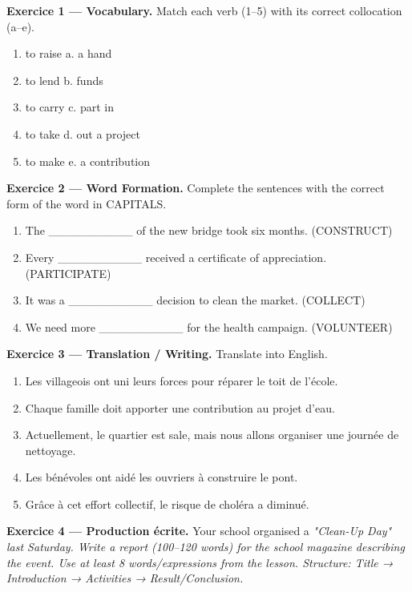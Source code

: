 \documentclass[11pt]{article}
\newcommand{\eng}[1]{\ifmmode\text{\textit{#1}}\else\begingroup\selectlanguage{english}\itshape #1\endgroup\fi}
\begin{document}
\begin{exercice}
\textbf{Exercice 1 — Vocabulary.} Match each verb (1–5) with its correct collocation (a–e).
\begin{enumerate}
\item to raise \quad a. a hand
\item to lend \quad b. funds
\item to carry \quad c. part in
\item to take \quad d. out a project
\item to make \quad e. a contribution
\end{enumerate}

\textbf{Exercice 2 — Word Formation.} Complete the sentences with the correct form of the word in CAPITALS.
\begin{enumerate}
\item The \_\_\_\_\_\_\_\_\_\_ of the new bridge took six months. (CONSTRUCT)
\item Every \_\_\_\_\_\_\_\_\_\_ received a certificate of appreciation. (PARTICIPATE)
\item It was a \_\_\_\_\_\_\_\_\_\_ decision to clean the market. (COLLECT)
\item We need more \_\_\_\_\_\_\_\_\_\_ for the health campaign. (VOLUNTEER)
\end{enumerate}

\textbf{Exercice 3 — Translation / Writing.} Translate into English.
\begin{enumerate}
\item Les villageois ont uni leurs forces pour réparer le toit de l'école.
\item Chaque famille doit apporter une contribution au projet d'eau.
\item Actuellement, le quartier est sale, mais nous allons organiser une journée de nettoyage.
\item Les bénévoles ont aidé les ouvriers à construire le pont.
\item Grâce à cet effort collectif, le risque de choléra a diminué.
\end{enumerate}

\textbf{Exercice 4 — Production écrite.} Your school organised a \eng{"Clean-Up Day"} last Saturday. Write a report (100–120 words) for the school magazine describing the event. Use at least 8 words/expressions from the lesson. Structure: Title → Introduction → Activities → Result/Conclusion.
\end{exercice}
\end{document}
